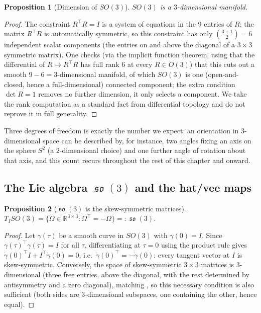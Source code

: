 \documentclass[11pt,a4paper]{report}
\newtheorem{proposition}[proposition]{Proposition}
\theoremstyle{definition}
\theoremstyle{remark}
\DeclareMathOperator{\so}{\mathfrak{so}}
\newcommand{\RR}{\mathbb R}
\begin{document}
\begin{proposition}[Dimension of $SO(3)$]
\label{prop:so3-dim}
$SO(3)$ is a $3$-dimensional manifold.
\end{proposition}

\begin{proof}
The constraint $R^\top R=I$ is a system of equations in the $9$ entries of
$R$; the matrix $R^\top R$ is automatically symmetric, so this constraint
has only $\binom{3+1}{2}=6$ independent scalar components (the entries on
and above the diagonal of a $3\times3$ symmetric matrix). One checks (via
the implicit function theorem, using that the differential of
$R\mapsto R^\top R$ has full rank $6$ at every $R\in O(3)$) that this cuts
out a smooth $9-6=3$-dimensional manifold, of which $SO(3)$ is one
(open-and-closed, hence a full-dimensional) connected component; the extra
condition $\det R=1$ removes no further dimension, it only selects a
component. We take the rank computation as a standard fact from
differential topology and do not reprove it in full generality.
\end{proof}

Three degrees of freedom is exactly the number we expect: an orientation in
$3$-dimensional space can be described by, for instance, two angles fixing
an axis on the sphere $S^2$ (a $2$-dimensional choice) and one further angle
of rotation about that axis, and this count recurs throughout the rest of
this chapter and  onward.

\subsection{The Lie algebra $\so(3)$ and the hat/vee maps}
\label{sec:so3-liealgebra}

\begin{proposition}[$\so(3)$ is the skew-symmetric matrices]
\label{prop:so3-liealgebra}
$T_ISO(3) = \{\Omega\in\RR^{3\times3} : \Omega^\top=-\Omega\}=:\so(3)$.
\end{proposition}

\begin{proof}
Let $\gamma(\tau)$ be a smooth curve in $SO(3)$ with $\gamma(0)=I$. Since
$\gamma(\tau)^\top\gamma(\tau)=I$ for all $\tau$, differentiating at $\tau=0$
using the product rule gives
$\dot\gamma(0)^\top I + I^\top\dot\gamma(0) = 0$, i.e.\
$\dot\gamma(0)^\top=-\dot\gamma(0)$: every tangent vector at $I$ is
skew-symmetric. Conversely, the space of skew-symmetric $3\times3$ matrices
is $3$-dimensional (three free entries, above the diagonal, with the rest
determined by antisymmetry and a zero diagonal), matching
, so this necessary condition is also sufficient (both
sides are $3$-dimensional subspaces, one containing the other, hence equal).
\end{proof}
\end{document}
